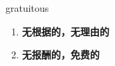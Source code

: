 
\begin{frame}
{\huge gratuitous}
\begin{center}
\begin{enumerate}\Large
  \item \textbf{无根据的，无理由的}
  \item \textbf{无报酬的，免费的}
\end{enumerate}
\end{center}
\end{frame}
